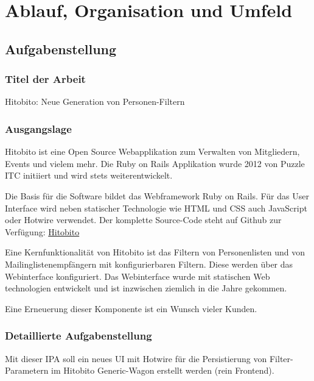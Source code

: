 \part[Ablauf, Organisation und Umfeld]{Ablauf, Organisation und Umfeld
    }

\tableofcontents

\chapter{Aufgabenstellung}

\section{Titel der Arbeit}
Hitobito: Neue Generation von Personen-Filtern

\section{Ausgangslage}
Hitobito ist eine Open Source Webapplikation zum Verwalten von Mitgliedern, Events und vielem mehr. Die Ruby on Rails Applikation wurde 2012 von Puzzle ITC initiiert und wird stets weiterentwickelt.

Die Basis für die Software bildet das Webframework Ruby on Rails. Für das User Interface wird neben statischer Technologie wie HTML und CSS auch JavaScript oder Hotwire verwendet. Der komplette Source-Code steht auf Github zur Verfügung: \href{https://github.com/hitobito/}{Hitobito}

Eine Kernfunktionalität von Hitobito ist das Filtern von Personenlisten und von Mailinglistenempfängern mit konfigurierbaren Filtern. Diese werden über das Webinterface konfiguriert. Das Webinterface wurde mit statischen Web technologien entwickelt und ist inzwischen ziemlich in die Jahre gekommen.

Eine Erneuerung dieser Komponente ist ein Wunsch vieler Kunden.

\newpage

\section{Detaillierte Aufgabenstellung}
Mit dieser IPA soll ein neues UI mit Hotwire für die Persistierung von Filter-Parametern im Hitobito Generic-Wagon erstellt werden (rein Frontend).

